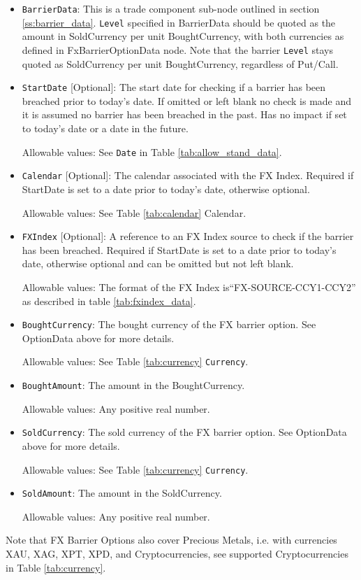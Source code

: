 \begin{itemize}
\begin{itemize}
\end{itemize}



\item \lstinline!BarrierData!: This is a trade component sub-node outlined in section \ref{ss:barrier_data}.
\lstinline!Level! specified in BarrierData should be quoted as the amount in SoldCurrency per unit BoughtCurrency, with both currencies as defined in FxBarrierOptionData node.
Note that the barrier  \lstinline!Level! stays quoted as SoldCurrency per unit BoughtCurrency, regardless of Put/Call.

\item \lstinline!StartDate! [Optional]: The start date for checking if a barrier has been breached prior to today's date.  If omitted or left blank no check is made and it is assumed no barrier has been breached in the past. Has no impact if set to today's date or a date in the future.

Allowable values:  See \lstinline!Date! in Table \ref{tab:allow_stand_data}.

\item \lstinline!Calendar! [Optional]: The calendar associated with the FX Index. Required if StartDate is set to a date prior to today's date, otherwise optional.

Allowable values: See Table \ref{tab:calendar} Calendar.

\item \lstinline!FXIndex! [Optional]: A reference to an FX Index source to check if the barrier has been breached. Required if StartDate is set to a date prior to today's date, otherwise optional and can be omitted but not left blank.

Allowable values:  The format of the FX Index is``FX-SOURCE-CCY1-CCY2'' as described in table \ref{tab:fxindex_data}. 

\item \lstinline!BoughtCurrency!: The bought currency of the FX barrier option. See OptionData above for more details.

Allowable values:  See Table \ref{tab:currency} \lstinline!Currency!.

\item \lstinline!BoughtAmount!: The amount in the BoughtCurrency.  

Allowable values:  Any positive real number.

\item \lstinline!SoldCurrency!: The sold currency of the FX barrier option. See OptionData above for more details.

Allowable values:  See Table \ref{tab:currency} \lstinline!Currency!.

\item \lstinline!SoldAmount!: The amount in the SoldCurrency.  

Allowable values:  Any positive real number.

\end{itemize}

Note that FX Barrier Options also cover Precious Metals, i.e. with
currencies XAU, XAG, XPT, XPD, and Cryptocurrencies,  see supported Cryptocurrencies in Table \ref{tab:currency}.
